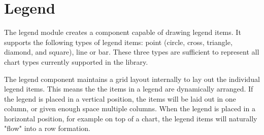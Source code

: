 \section{Legend}
The legend module creates a component capable of drawing legend items. It supports the following types of legend items: point (circle, cross, triangle, diamond, and square), line or bar. These three types are sufficient to represent all chart types currently supported in the library.

The legend component maintains a grid layout internally to lay out the individual legend items. This means the the items in a legend are dynamically arranged. If the legend is placed in a vertical position, the items will be laid out in one column, or given enough space multiple columns. When the legend is placed in a horizontal position, for example on top of a chart, the legend items will naturally "flow" into a row formation.

